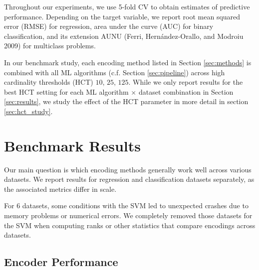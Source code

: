 \documentclass[smallextended]{svjour3}       %
\begin{document}
Throughout our experiments, we use 5-fold CV to obtain estimates of predictive performance.
Depending on the target variable, we report root mean squared error (RMSE) for regression, area under the curve (AUC) for binary classification, and its extension AUNU (Ferri, Hernández-Orallo, and Modroiu 2009) for multiclass problems.

In our benchmark study, each encoding method listed in Section \ref{sec:methods} is combined with all ML algorithms (c.f. Section \ref{sec:pipeline}) across
high cardinality thresholds (HCT) \(10\), \(25\), \(125\).
While we only report results for the best HCT setting for each ML algorithm \(\times\) dataset combination in Section \ref{sec:results}, we study the effect of the HCT parameter in more detail in section \ref{sec:hct_study}.

\hypertarget{benchmark-results}{%
\section{Benchmark Results}\label{benchmark-results}}

\label{sec:results}

Our main question is which encoding methods generally work well across various datasets.
We report results for regression and classification datasets separately, as the associated metrics differ in scale.

For 6 datasets, some conditions with the SVM led to unexpected crashes due to memory problems or numerical errors.
We completely removed those datasets for the SVM when computing ranks or other statistics that compare encodings across datasets.

\hypertarget{encoder-performance}{%
\subsection{Encoder Performance}\label{encoder-performance}}
\end{document}
